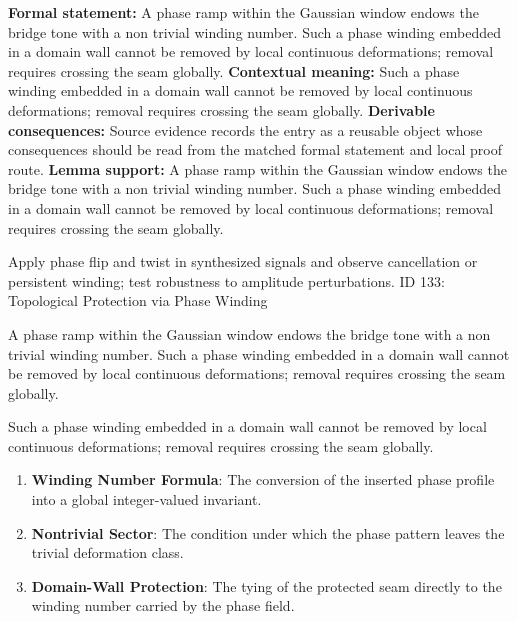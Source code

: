 \begingroup\footnotesize\setlength{\emergencystretch}{3em}\sloppy
\textbf{Formal statement:} A phase ramp within the Gaussian window endows the bridge tone with a non trivial winding number. Such a phase winding embedded in a domain wall cannot be removed by local continuous deformations; removal requires crossing the seam globally.
\textbf{Contextual meaning:} Such a phase winding embedded in a domain wall cannot be removed by local continuous deformations; removal requires crossing the seam globally.
\textbf{Derivable consequences:} Source evidence records the entry as a reusable object whose consequences should be read from the matched formal statement and local proof route.
\textbf{Lemma support:} A phase ramp within the Gaussian window endows the bridge tone with a non trivial winding number. Such a phase winding embedded in a domain wall cannot be removed by local continuous deformations; removal requires crossing the seam globally.\par
\endgroup

Apply phase flip and twist in synthesized signals and observe cancellation or persistent winding; test robustness to amplitude perturbations. ID 133: Topological Protection via Phase Winding

A phase ramp within the Gaussian window endows the bridge tone with a non trivial winding number. Such a phase winding embedded in a domain wall cannot be removed by local continuous deformations; removal requires crossing the seam globally.

Such a phase winding embedded in a domain wall cannot be removed by local continuous deformations; removal requires crossing the seam globally.
\endgroup

\begin{enumerate}[leftmargin=1.6em,itemsep=6pt,topsep=4pt]
\item \textbf{Winding Number Formula}: The conversion of the inserted phase profile into a global integer-valued invariant.
\item \textbf{Nontrivial Sector}: The condition under which the phase pattern leaves the trivial deformation class.
\item \textbf{Domain-Wall Protection}: The tying of the protected seam directly to the winding number carried by the phase field.
\end{enumerate}

